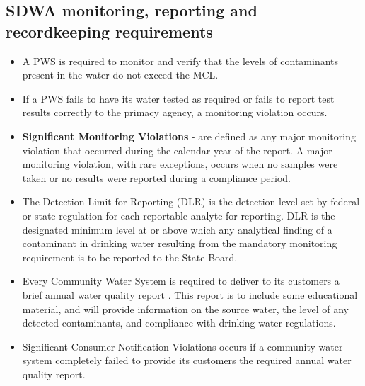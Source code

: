 \subsection{SDWA monitoring, reporting and recordkeeping requirements}
\begin{itemize}
\item A PWS is required to monitor and verify that the levels of contaminants present in the
water do not exceed the MCL. 
\item If a PWS fails to have its water tested as required or fails to report test results correctly to the primacy agency, a monitoring violation occurs.
\item \textbf{Significant Monitoring Violations}  - are defined as any major monitoring violation that occurred during the calendar year of the report. A major monitoring violation, with rare exceptions, occurs when no samples were taken or no results were reported during a compliance period.
\item The Detection Limit for Reporting (DLR) is the detection level set by federal or state regulation for each reportable analyte for reporting.  DLR is the designated minimum level at or above which any analytical finding of a contaminant in drinking water resulting from the mandatory monitoring requirement is to be reported to the State Board.
\item Every Community Water System is required to deliver to its customers a brief annual water quality report . This report is to include some educational material, and will provide information on the source water, the level of any detected contaminants, and compliance with drinking water regulations.
\item Significant Consumer Notification Violations  occurs if a community water system completely failed to provide its customers the required annual water quality report.


\end{itemize}
